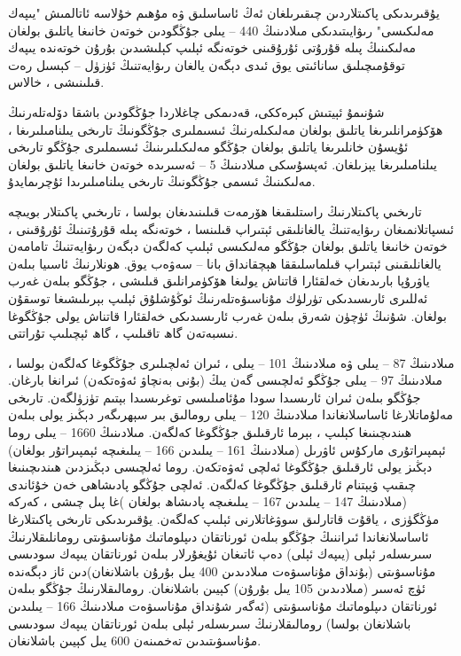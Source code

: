 \documentclass[a4paper]{article}
\begin{document}
يۇقىرىدىكى پاكىتلاردىن چىقىرىلغان ئەڭ ئاساسلىق ۋە مۇھىم خۇلاسە ئاتالمىش "يىپەك مەلىكىسى" رىۋايىتىدىكى مىلادىنىڭ 440 – يىلى جۇڭگودىن خوتەن خانىغا ياتلىق بولغان مەلىكىنىڭ پىلە قۇرۇتى ئۇرۇقىنى خوتەنگە ئېلىپ كېلىشىدىن بۇرۇن خوتەندە يىپەك توقۇمىچىلىق سانائىتى يوق ئىدى دېگەن يالغان رىۋايەتنىڭ ئۈزۈل – كېسىل رەت قىلىنىشى ، خالاس.

شۇنىمۇ ئېيتىش كېرەككى، قەدىمكى چاغلاردا جۇڭگودىن باشقا دۆلەتلەرنىڭ ھۆكۈمرانلىرىغا ياتلىق بولغان مەلىكىلەرنىڭ ئىسىملىرى جۇڭگونىڭ تارىخى يىلنامىلىرىغا ، ئۇيسۇن خانلىرىغا ياتلىق بولغان جۇڭگو مەلىكىلىرىنىڭ ئىسىملىرى جۇڭگو تارىخى يىلنامىلىرىغا يېزىلغان. ئەپسۇسكى مىلادىنىڭ 5 – ئەسىرىدە خوتەن خانىغا ياتلىق بولغان مەلىكىنىڭ ئىسمى جۇڭگونىڭ تارىخى يىلنامىلىرىدا ئۇچرىمايدۇ.



تارىخىي پاكىتلارنىڭ راستلىقىغا ھۆرمەت قىلىنىدىغان بولسا ، تارىخىي پاكىتلار بويىچە ئىسپاتلانمىغان رىۋايەتنىڭ يالغانلىقى ئېتىراپ قىلىنسا ، خوتەنگە پىلە قۇرۇتىنىڭ ئۇرۇقىنى ، خوتەن خانىغا ياتلىق بولغان جۇڭگو مەلىكىسى ئېلىپ كەلگەن دېگەن رىۋايەتنىڭ تامامەن يالغانلىقىنى ئېتىراپ قىلماسلىققا ھېچقانداق بانا – سەۋەب يوق. ھونلارنىڭ ئاسىيا بىلەن ياۋرۇپا بارىدىغان خەلقئارا قاتناش يولىغا ھۆكۈمرانلىق قىلىشى ، جۇڭگو بىلەن غەرب ئەللىرى ئارىسىدىكى تۈرلۈك مۇناسىۋەتلەرنىڭ ئوڭۇشلۇق ئېلىپ بېرىلىشىغا توسقۇن بولغان. شۇنىڭ ئۈچۈن شەرق بىلەن غەرب ئارىسىدىكى خەلقئارا قاتناش يولى جۇڭگوغا نىسبەتەن گاھ تاقىلىپ ، گاھ ئېچىلىپ تۇراتتى.



مىلادىنىڭ 87 – يىلى ۋە مىلادىنىڭ 101 – يىلى ، ئىران ئەلچىلىرى جۇڭگوغا كەلگەن بولسا ، مىلادىنىڭ 97 – يىلى جۇڭگو ئەلچىسى گەن يىڭ (بۇنى بەنچاۋ ئەۋەتكەن) ئىرانغا بارغان. جۇڭگو بىلەن ئىران ئارىسىدا سودا مۇئامىلىسى توغرىسىدا بېتىم تۈزۈلگەن. تارىخى مەلۇماتلارغا ئاساسلانغاندا مىلادىنىڭ 120 – يىلى رومالىق بىر سېھرىگەر دېڭىز يولى بىلەن ھىندىچىنىغا كېلىپ ، بېرما ئارقىلىق جۇڭگوغا كەلگەن. مىلادىنىڭ 1660 – يىلى روما ئېمپىراتۇرى ماركۇس ئاۋرىل (مىلادىنىڭ 161 – يىلىدىن 166 – يىلىغىچە ئېمپىراتۇر بولغان) دېڭىز يولى ئارقىلىق جۇڭگوغا ئەلچى ئەۋەتكەن. روما ئەلچىسى دېڭىزدىن ھىندىچىنىغا چىقىپ ۋيېتنام ئارقىلىق جۇڭگوغا كەلگەن. ئەلچى جۇڭگو پادىشاھى خەن خۇئاندى (مىلادىنىڭ 147 – يىلىدىن 167 – يىلىغىچە پادىشاھ بولغان )غا پىل چىشى ، كەركە مۈڭگۈزى ، ياقۇت قاتارلىق سوۋغاتلارنى ئېلىپ كەلگەن. يۇقىرىدىكى تارىخى پاكىتلارغا ئاساسلانغاندا ئىراننىڭ جۇڭگو بىلەن ئورناتقان دىپلوماتىك مۇناسىۋىتى رومانلىقلارنىڭ سىرىسلەر ئېلى (يىپەك ئېلى) دەپ ئاتىغان ئۇيغۇرلار بىلەن ئورناتقان يىپەك سودىسى مۇناسىۋىتى (بۇنداق مۇناسىۋەت مىلادىدىن 400 يىل بۇرۇن باشلانغان)دىن ئاز دېگەندە ئۈچ ئەسىر (مىلادىدىن 105 يىل بۇرۇن) كېيىن باشلانغان. رومالىقلارنىڭ جۇڭگو بىلەن ئورناتقان دىپلوماتىك مۇناسىۋىتى (ئەگەر شۇنداق مۇناسىۋەت مىلادىنىڭ 166 – يىلىدىن باشلانغان بولسا) رومالىقلارنىڭ سىرىسلەر ئېلى بىلەن ئورناتقان يىپەك سودىسى مۇناسىۋىتىدىن تەخمىنەن 600 يىل كېيىن باشلانغان.
\end{document}
